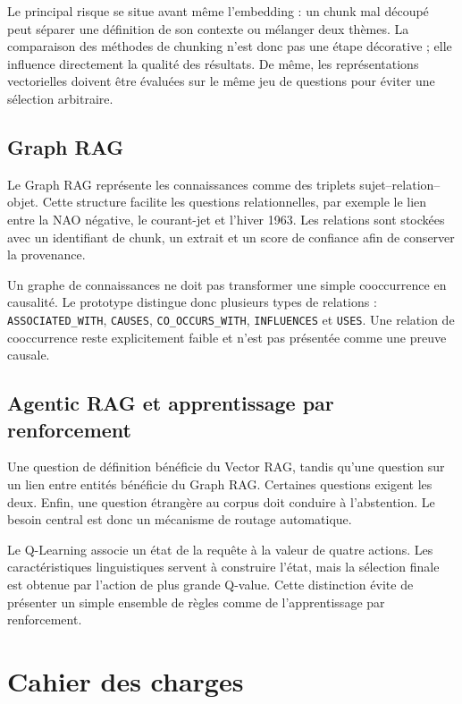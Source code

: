 \documentclass[12pt,a4paper,oneside]{report}
\newcommand{\tech}[1]{\texttt{#1}}
\begin{document}
Le principal risque se situe avant même l'embedding : un chunk mal découpé peut séparer une définition de son contexte ou mélanger deux thèmes. La comparaison des méthodes de chunking n'est donc pas une étape décorative ; elle influence directement la qualité des résultats. De même, les représentations vectorielles doivent être évaluées sur le même jeu de questions pour éviter une sélection arbitraire.

\subsection{Graph RAG}
Le Graph RAG représente les connaissances comme des triplets sujet--relation--objet. Cette structure facilite les questions relationnelles, par exemple le lien entre la NAO négative, le courant-jet et l'hiver 1963. Les relations sont stockées avec un identifiant de chunk, un extrait et un score de confiance afin de conserver la provenance.

Un graphe de connaissances ne doit pas transformer une simple cooccurrence en causalité. Le prototype distingue donc plusieurs types de relations : \tech{ASSOCIATED\_WITH}, \tech{CAUSES}, \tech{CO\_OCCURS\_WITH}, \tech{INFLUENCES} et \tech{USES}. Une relation de cooccurrence reste explicitement faible et n'est pas présentée comme une preuve causale.

\subsection{Agentic RAG et apprentissage par renforcement}
Une question de définition bénéficie du Vector RAG, tandis qu'une question sur un lien entre entités bénéficie du Graph RAG. Certaines questions exigent les deux. Enfin, une question étrangère au corpus doit conduire à l'abstention. Le besoin central est donc un mécanisme de routage automatique.

Le Q-Learning associe un état de la requête à la valeur de quatre actions. Les caractéristiques linguistiques servent à construire l'état, mais la sélection finale est obtenue par l'action de plus grande Q-value. Cette distinction évite de présenter un simple ensemble de règles comme de l'apprentissage par renforcement.

\section{Cahier des charges}
\end{document}
